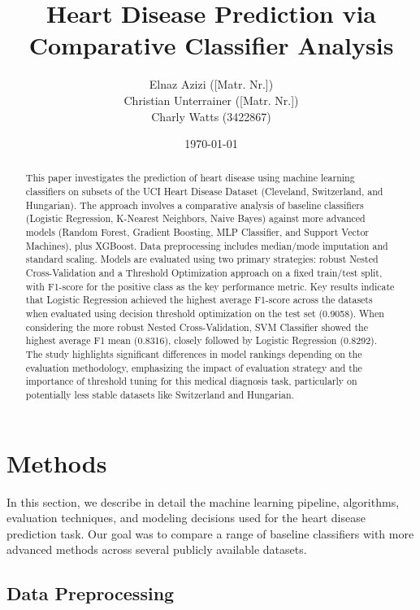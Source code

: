 \documentclass{article}
\title{Heart Disease Prediction via Comparative Classifier Analysis}
\author{
    Elnaz Azizi ([Matr. Nr.]) \\ %
    Christian Unterrainer ([Matr. Nr.])\\ %
    Charly Watts (3422867)
}
\date{\today}
\begin{document}
\maketitle
\begin{abstract}
This paper investigates the prediction of heart disease using machine learning classifiers on subsets of the UCI Heart Disease Dataset (Cleveland, Switzerland, and Hungarian). The approach involves a comparative analysis of baseline classifiers (Logistic Regression, K-Nearest Neighbors, Naive Bayes) against more advanced models (Random Forest, Gradient Boosting, MLP Classifier, and Support Vector Machines), plus XGBoost. Data preprocessing includes median/mode imputation and standard scaling. Models are evaluated using two primary strategies: robust Nested Cross-Validation and a Threshold Optimization approach on a fixed train/test split, with F1-score for the positive class as the key performance metric. Key results indicate that Logistic Regression achieved the highest average F1-score across the datasets when evaluated using decision threshold optimization on the test set (0.9058). When considering the more robust Nested Cross-Validation, SVM Classifier showed the highest average F1 mean (0.8316), closely followed by Logistic Regression (0.8292). The study highlights significant differences in model rankings depending on the evaluation methodology, emphasizing the impact of evaluation strategy and the importance of threshold tuning for this medical diagnosis task, particularly on potentially less stable datasets like Switzerland and Hungarian.
\end{abstract}

\section{Methods}



In this section, we describe in detail the machine learning pipeline, algorithms, evaluation techniques, and modeling decisions used for the heart disease prediction task. Our goal was to compare a range of baseline classifiers with more advanced methods across several publicly available datasets.



\subsection{Data Preprocessing}
\end{document}
